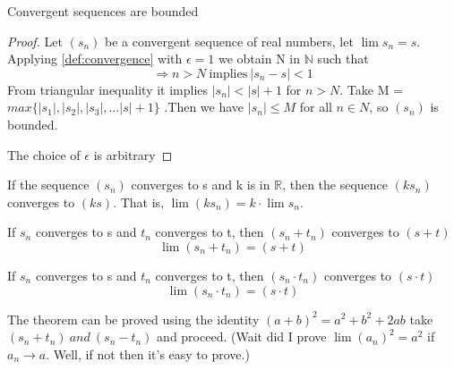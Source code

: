 \documentclass{notes}
\begin{document}
\begin{theorem}{}
	Convergent sequences are bounded
	\label{bounded sequences}
\end{theorem}
\begin{proof}
	
	Let $(s_n)$ be a convergent sequence of real numbers, let $\lim s_n = s$.
	Applying \ref{def:convergence} with $\epsilon = 1$ we obtain N in $\mathbb{N}$ such that
	$$\Rightarrow n>N\ \text{implies}\ |s_n - s|<1 $$
	From triangular inequality it implies $|s_n|<|s|+1$ for  $n > N$.
	Take M = $max\{ |s_1|,|s_2|,|s_3|,\ldots|s|+1\}$ .Then we have $|s_n|\leq M$ for all $n\in N$, so $(s_n)$ is bounded.
	
	The choice of $\epsilon$ is arbitrary
\end{proof}

\begin{theorem}{}
	If the sequence $(s_n)$ converges to s and k is in $\mathbb{R}$, then the sequence
	$(ks_n)$ converges to $(ks)$. That is, $\lim (ks_n) = k \cdot \lim s_n$.
\end{theorem}

\begin{theorem}{}
	If $s_n$ converges to s and $t_n$ converges to t, then $(s_n +t_n)$ converges to $(s+t)$
	$$\lim (s_n + t_n ) = (s+t)$$
\end{theorem}
\begin{theorem}{}
	If $s_n$ converges to s and $t_n$ converges to t, then $(s_n \cdot t_n)$ converges to $(s\cdot t)$
	$$\lim (s_n \cdot t_n ) = (s \cdot t)$$
	
	The theorem can be proved using the identity $(a+b)^2 = a^2 + b^2 +2ab$ take $(s_n+t_n)\ and\ (s_n-t_n)$   and proceed. (Wait did I prove $\lim (a_n)^2 = a^2$ if $a_n \to a$. Well, if not then it's easy to prove.)
	
\end{theorem}
\end{document}
